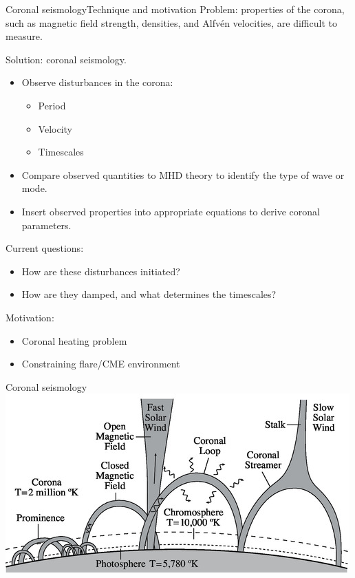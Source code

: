 \documentclass[table]{beamer}
\begin{document}
\begin{frame}{Coronal seismology}{Technique and motivation}
    Problem: properties of the corona, such as magnetic field strength,
    densities, and Alfv\'en velocities, are difficult to measure.

    Solution: coronal seismology.
    \begin{itemize}
        \item Observe disturbances in the corona:
            \begin{itemize}
                \item Period
                \item Velocity
                \item Timescales
            \end{itemize}
        \item Compare observed quantities to MHD theory to identify the
            type of wave or mode.
        \item Insert observed properties into appropriate equations to
            derive coronal parameters.
    \end{itemize}
    Current questions:
    \begin{itemize}
        \item How are these disturbances initiated?
        \item How are they damped, and what determines the timescales?
    \end{itemize}
    Motivation:
    \begin{itemize}
        \item Coronal heating problem
        \item Constraining flare/CME environment
    \end{itemize}
\end{frame}%
\begin{frame}{Coronal seismology}
    \includegraphics[width=\textwidth]{loop_diagram.jpg}
\end{frame}%
\end{document}
